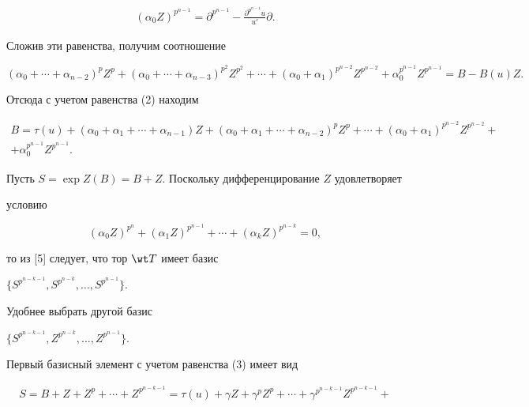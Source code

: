 \begin{pf}
\begin{gather*}
(\alpha_0Z)^{p^{n-1}}=\partial^{p^{n-1}}- 


\frac{\partial^{p^{n-1}}u}{u'}\partial. 


\end{gather*} 


Сложив эти равенства, получим соотношение 


$$ 


(\alpha_0+\dotsb+\alpha_{n-2})^p Z^p+ 


(\alpha_0+\dotsb+\alpha_{n-3})^{p^2}Z^{p^2}+\dotsb+ 


(\alpha_0+\alpha_1)^{p^{n-2}}Z^{p^{n-2}}+ 


\alpha_0^{p^{n-1}}Z^{p^{n-1}}=B-B(u)Z. 


$$ 


Отсюда с учетом равенства (2) находим 


\begin{multline} 


B=\tau(u)+(\alpha_0+\alpha_1+\dotsb+\alpha_{n-1})Z+ 


(\alpha_0+\alpha_1+\dotsb+\alpha_{n-2})^p Z^p+\dotsb+ 


(\alpha_0+\alpha_1)^{p^{n-2}}Z^{p^{n-2}}+ \\


+ \alpha_0^{p^{n-1}}Z^{p^{n-1}}. 


\end{multline} 


Пусть $S=\exp Z(B)=B+Z$. Поскольку дифференцирование $Z$ удовлетворяет 


условию 


$$ 


(\alpha_0Z)^{p^n}+(\alpha_1Z)^{p^{n-1}}+\dotsb+ 


(\alpha_k Z)^{p^{n-k}}=0, 


$$ 


то из [5] следует, что тор $\wt T$ имеет базис 


$\{S^{p^{n-k-1}},S^{p^{n-k}},\dotsc,S^{p^{n-1}}\}$. 


Удобнее выбрать другой базис 


$\{S^{p^{n-k-1}},Z^{p^{n-k}},\dotsc,Z^{p^{n-1}}\}$. 


Первый базисный элемент с учетом равенства (3) имеет вид 


\begin{multline*}  


S=B+Z+Z^p+\dotsb+Z^{p^{n-k-1}}=\tau(u)+\gamma Z+ 


\gamma^p Z^p+\dotsb+\gamma^{p^{n-k-1}}Z^{p^{n-k-1}}+ \\



\end{multline*}
\end{pf}
